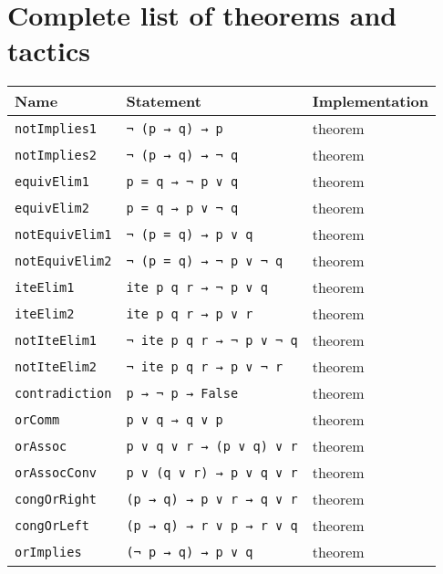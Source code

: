\documentclass[
	msc,
	english
]{ppgccufmg}
\begin{document}
    \appendix
    \chapter{Complete list of theorems and tactics}


\begin{longtabu} to \textwidth { l l l }
\toprule
Name        & Statement & Implementation \\ \midrule
\texttt{notImplies1} & \texttt{¬ (p → q) → p} & theorem \\ \midrule
\texttt{notImplies2} & \texttt{¬ (p → q) → ¬ q}      & theorem        \\ \midrule
\texttt{equivElim1}  & \texttt{p = q → ¬ p ∨ q}      & theorem        \\ \midrule
\texttt{equivElim2}  & \texttt{p = q → p ∨ ¬ q}      & theorem        \\ \midrule
\texttt{notEquivElim1}  & \texttt{¬ (p = q) → p ∨ q}  & theorem        \\ \midrule
\texttt{notEquivElim2}  &  \texttt{¬ (p = q) → ¬ p ∨ ¬ q}      & theorem        \\ \midrule
\texttt{iteElim1} & \texttt{ite p q r → ¬ p ∨ q} & theorem \\ \midrule
\texttt{iteElim2} & \texttt{ite p q r → p ∨ r} & theorem \\ \midrule
\texttt{notIteElim1} & \texttt{¬ ite p q r → ¬ p ∨ ¬ q} & theorem \\ \midrule
\texttt{notIteElim2} & \texttt{¬ ite p q r → p ∨ ¬ r} & theorem \\ \midrule
\texttt{contradiction} & \texttt{p → ¬ p → False} & theorem \\ \midrule
\texttt{orComm} & \texttt{p ∨ q → q ∨ p} & theorem \\ \midrule
\texttt{orAssoc} & \texttt{p ∨ q ∨ r → (p ∨ q) ∨ r} & theorem \\ \midrule
\texttt{orAssocConv} & \texttt{p ∨ (q ∨ r) → p ∨ q ∨ r} & theorem \\ \midrule
\texttt{congOrRight} & \texttt{(p → q) → p ∨ r → q ∨ r} & theorem \\ \midrule
\texttt{congOrLeft} & \texttt{(p → q) → r ∨ p → r ∨ q} & theorem \\ \midrule
\texttt{orImplies} & \texttt{(¬ p → q) → p ∨ q} & theorem \\ \midrule

\end{longtabu}
\end{document}
